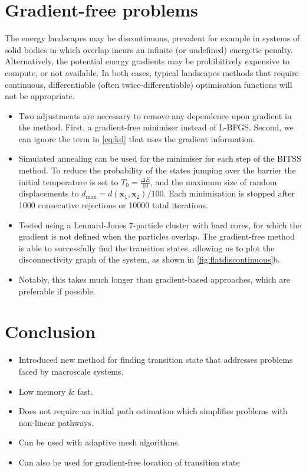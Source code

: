 \documentclass[aps,twocolumn]{revtex4}
\begin{document}
\section{Gradient-free problems}
\topic The energy landscapes may be discontinuous, prevalent for example in systems of solid bodies in which overlap incurs an infinite (or undefined) energetic penalty.
Alternatively, the potential energy gradients may be prohibitively expensive to compute, or not available.
In both cases, typical landscapes methods that require continuous, differentiable (often twice-differentiable) optimisation functions will not be appropriate.

\begin{itemize}
\item
Two adjustments are necessary to remove any dependence upon gradient in the method.
First, a gradient-free minimiser instead of L-BFGS.
Second, we can ignore the term in \cref{eq:kd} that uses the gradient information.
\item
Simulated annealing can be used for the minimiser for each step of the BITSS method.
To reduce the probability of the states jumping over the barrier the initial temperature is set to $T_0 = \frac{\Delta E}{10}$, and the maximum size of random displacements to $d_\text{max} = d(\bm{x}_1, \bm{x}_2) / 100$.
Each minimisation is stopped after 1000 consecutive rejections or 10000 total iterations.
\item
Tested using a Lennard-Jones 7-particle cluster with hard cores, for which the gradient is not defined when the particles overlap.
The gradient-free method is able to successfully find the transition states, allowing us to plot the disconnectivity graph of the system, as shown in \cref{fig:flatdiscontinuous}b.
\item
Notably, this takes much longer than gradient-based approaches, which are preferable if possible.
\end{itemize}


\section{Conclusion}
\begin{itemize}
\item
Introduced new method for finding transition state that addresses problems faced by macroscale systems.
\item
Low memory \& fast.
\item
Does not require an initial path estimation which simplifies problems with non-linear pathways.
\item
Can be used with adaptive mesh algorithms.
\item
Can also be used for gradient-free location of transition state
\end{itemize}




\end{document}
